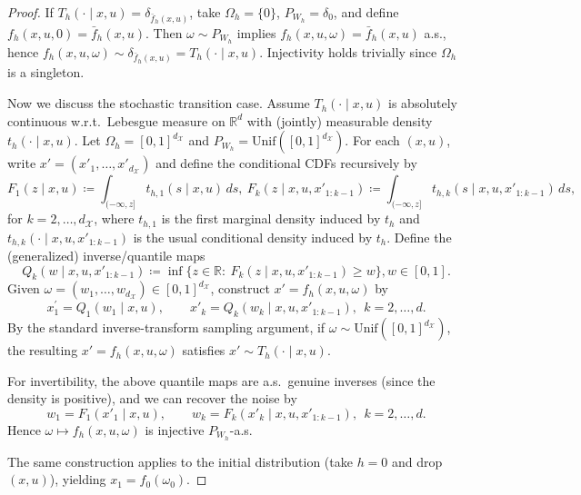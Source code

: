\documentclass{article}
\begin{document}
\begin{proof}
If $T_h(\cdot\mid x,u)=\delta_{\bar f_h(x,u)}$, take $\Omega_h=\{0\}$,
$P_{W_h}=\delta_0$, and define $f_h(x,u,0)=\bar f_h(x,u)$.
Then $\omega\sim P_{W_h}$ implies $f_h(x,u,\omega)=\bar f_h(x,u)$ a.s., hence
$f_h(x,u,\omega)\sim \delta_{\bar f_h(x,u)}=T_h(\cdot\mid x,u)$.
Injectivity holds trivially since $\Omega_h$ is a singleton.

Now we discuss the stochastic transition case. Assume $T_h(\cdot\mid x,u)$ is absolutely continuous w.r.t.\ Lebesgue measure on $\mathbb R^d$
with (jointly) measurable density $t_h(\cdot\mid x,u)$.
Let $\Omega_h=[0,1]^{d_\mathcal X}$ and $P_{W_h}=\mathrm{Unif}([0,1]^{d_\mathcal X})$.
For each $(x,u)$, write $x'=(x'_1,\ldots,x'_{d_\mathcal X})$ and define the conditional CDFs
recursively by
\begin{equation*}
    F_{1}(z\mid x,u)
\coloneqq  \int_{(-\infty,z]} t_{h,1}(s\mid x,u)\,ds,\ 
F_{k}(z\mid x,u,x'_{1:k-1})
\coloneqq  \int_{(-\infty,z]} t_{h,k}(s\mid x,u,x'_{1:k-1})\,ds,
\end{equation*}
for $k=2,\ldots,d_{\mathcal X}$, where $t_{h,1}$ is the first marginal density induced by $t_h$
and $t_{h,k}(\cdot\mid x,u,x'_{1:k-1})$ is the usual conditional density induced by $t_h$.
Define the (generalized) inverse/quantile maps
\begin{equation*}
    Q_{k}(w\mid x,u,x'_{1:k-1})
\coloneqq  \inf\{z\in\mathbb R:\ F_k(z\mid x,u,x'_{1:k-1})\ge w\}, w\in[0,1].
\end{equation*}
Given $\omega=(w_1,\ldots,w_{d_\mathcal X})\in[0,1]^{d_\mathcal X}$, construct $x'=f_h(x,u,\omega)$ by
\begin{equation*}
    x^\prime_1 = Q_1(w_1\mid x,u),
\qquad
x'_k = Q_k(w_k\mid x,u,x'_{1:k-1}),\ \ k=2,\ldots,d.
\end{equation*}
By the standard inverse-transform sampling argument, if $\omega\sim \mathrm{Unif}([0,1]^{d_\mathcal X})$,
the resulting $x'=f_h(x,u,\omega)$ satisfies $x'\sim T_h(\cdot\mid x,u)$.

For invertibility, the above quantile maps are a.s.\ genuine inverses (since the density is positive),
and we can recover the noise by
\begin{equation*}
    w_1 = F_1(x'_1\mid x,u),
\qquad
w_k = F_k(x'_k\mid x,u,x'_{1:k-1}),\ \ k=2,\ldots,d.
\end{equation*}
Hence $\omega\mapsto f_h(x,u,\omega)$ is injective $P_{W_h}$-a.s.

The same construction applies to the initial distribution (take $h=0$ and drop $(x,u)$),
yielding $x_1=f_0(\omega_0)$.
\end{proof}
\end{document}
